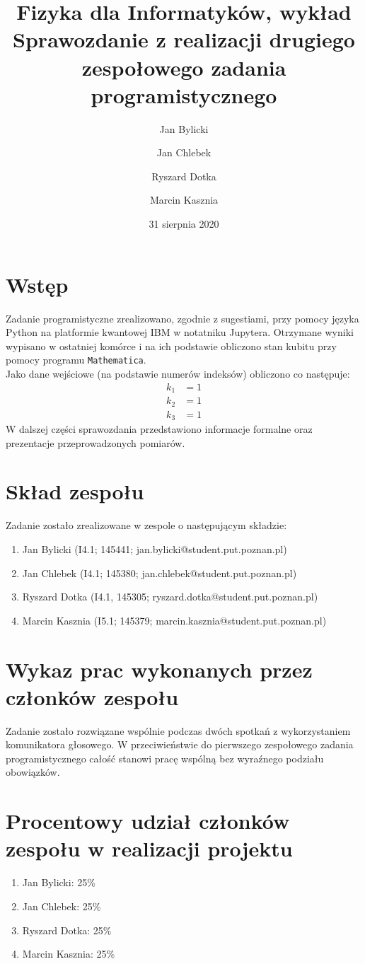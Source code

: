 \documentclass{article}
\title{Fizyka dla Informatyków, wykład\\ Sprawozdanie z realizacji drugiego zespołowego zadania programistycznego}
\author{Jan Bylicki \and Jan Chlebek \and Ryszard Dotka \and Marcin Kasznia}
\date{31 sierpnia 2020}
\begin{document}
\maketitle

\section{Wstęp}
Zadanie programistyczne zrealizowano, zgodnie z sugestiami, przy pomocy języka Python na platformie kwantowej IBM w notatniku Jupytera. Otrzymane wyniki wypisano w ostatniej komórce i na ich podstawie obliczono stan kubitu przy pomocy programu \verb+Mathematica+.\\
Jako dane wejściowe (na podstawie numerów indeksów) obliczono co następuje:
\begin{align*}
    k_1&=1\\
    k_2&=1\\
    k_3&=1
\end{align*}
W dalszej części sprawozdania przedstawiono informacje formalne oraz prezentacje przeprowadzonych pomiarów.

\section{Skład zespołu}
Zadanie zostało zrealizowane w zespole o następującym składzie:
\begin{enumerate}
    \item Jan Bylicki (I4.1; 145441; jan.bylicki@student.put.poznan.pl)
    \item Jan Chlebek (I4.1; 145380; jan.chlebek@student.put.poznan.pl)
    \item Ryszard Dotka (I4.1, 145305; ryszard.dotka@student.put.poznan.pl)
    \item Marcin Kasznia (I5.1; 145379; marcin.kasznia@student.put.poznan.pl)
\end{enumerate}

\section{Wykaz prac wykonanych przez członków zespołu}
    Zadanie zostało rozwiązane wspólnie podczas dwóch spotkań z wykorzystaniem komunikatora głosowego. W przeciwieństwie do pierwszego zespołowego zadania programistycznego całość stanowi pracę wspólną bez wyraźnego podziału obowiązków.
    

\section{Procentowy udział członków zespołu w realizacji projektu}
\begin{enumerate}
    \item Jan Bylicki: 25\%
    \item Jan Chlebek: 25\%
    \item Ryszard Dotka: 25\%
    \item Marcin Kasznia: 25\%
\end{enumerate}
\end{document}
